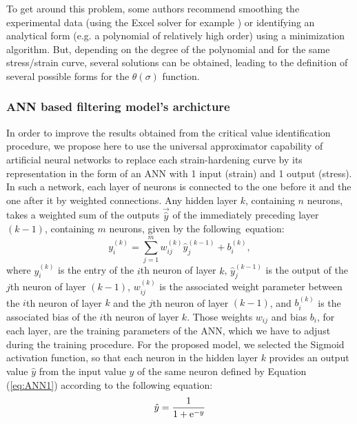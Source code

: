 \documentclass[metals,article,submit,pdftex,moreauthors]{Definitions/mdpi}
\DeclareRobustCommand{\e}[1]{{\rm e}^{#1}}
\DeclareRobustCommand{\lay}[1]{^{(#1)}}
\begin{document}
To get around this problem, some authors recommend smoothing the experimental data (using the Excel solver for example \cite{Najafizadeh-2006}) or identifying an analytical form (e.g. a polynomial of relatively high order) using a minimization algorithm.
But, depending on the degree of the polynomial and for the same stress/strain curve, several solutions can be obtained, leading to the definition of several possible forms for the $\theta(\sigma)$ function.

\subsubsection{ANN based filtering model's archicture \label{subsec:ANNbasics}}
In order to improve the results obtained from the critical value identification procedure, we propose here to use the universal approximator capability of artificial neural networks to replace each strain-hardening curve by its representation in the form of an ANN with 1 input (strain) and 1 output (stress).
In such a network, each layer of neurons is connected to the one before it and the one after it by weighted connections.
Any hidden layer $k$, containing $n$ neurons, takes a weighted sum of the outputs $\overrightarrow{\hat{y}}$ of the immediately preceding layer $(k-1)$, containing $m$ neurons, given by the following~equation:
\begin{equation}
y_i\lay{k} = \sum_{j=1}^m w_{ij}\lay{k} \hat{y}_j^{(k-1)}+ b_i\lay{k},\label{eq:ANN1}
\end{equation}
where $y_i\lay{k}$ is the entry of the  $i$th neuron of layer $k$, $\hat{y}_j\lay{k-1}$ is the output of the $j$th neuron of layer $(k-1)$, $w_{ij}\lay{k}$ is the associated weight parameter between the  $i$th neuron of layer $k$ and the  $j$th neuron of layer $(k-1)$, and $b_i\lay{k}$ is the associated bias of the  $i$th neuron of layer $k$.
Those weights $w_{ij}$ and bias $b_i$, for each layer, are the training parameters of the ANN, which we have to adjust during the training procedure.
For the proposed model, we selected the Sigmoid activation function, so that each neuron in the hidden layer $k$ provides an output value ${\hat{y}}$ from the input value $y$ of the same neuron defined by Equation (\ref{eq:ANN1}) according to the following equation:
\begin{equation}
\hat{y}=\frac{1}{1 + \e{-y}}\label{eq:ANN2}
\end{equation}
\end{document}
